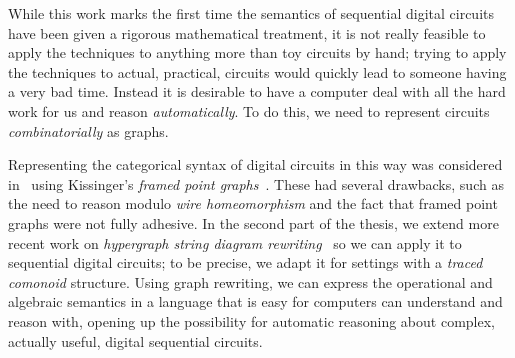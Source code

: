 While this work marks the first time the semantics of sequential digital
circuits have been given a rigorous mathematical treatment, it is not really
feasible to apply the techniques to anything more than toy circuits by hand;
trying to apply the techniques to actual, practical, circuits would quickly lead
to someone having a very bad time.
Instead it is desirable to have a computer deal with all the hard work
for us and reason \emph{automatically}.
To do this, we need to represent circuits \emph{combinatorially} as graphs.

Representing the categorical syntax of digital circuits in this way was
considered in~\cite{ghica2017diagrammatic} using
Kissinger's \emph{framed point graphs}~\cite{kissinger2012pictures}.
These had several drawbacks, such as the need to reason modulo
\emph{wire homeomorphism} and the fact that framed point graphs were not fully
adhesive.
In the second part of the thesis, we extend more recent work on
\emph{hypergraph string diagram rewriting}~\cite{bonchi2022string,bonchi2022stringa,bonchi2022stringb}
so we can apply it to sequential digital circuits; to be precise, we adapt it
for settings with a \emph{traced comonoid} structure.
Using graph rewriting, we can express the operational and algebraic semantics
in a language that is easy for computers can understand and reason with, opening
up the possibility for automatic reasoning about complex, actually useful,
digital sequential circuits.
